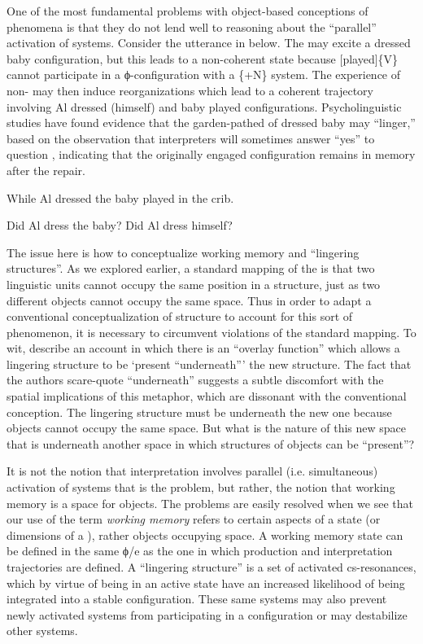 One of the most fundamental problems with object-based conceptions of  phenomena is that they do not lend well to reasoning about the “parallel” activation of systems. Consider the  utterance in  below. The  may excite a {\textbar}dressed baby{\textbar} configuration, but this leads to a non-coherent state because [played]\{V\} cannot participate in a ϕ-configuration with a \{+N\} system. The experience of non- may then induce reorganizations which lead to a coherent trajectory involving {\textbar}Al dressed (himself){\textbar} and {\textbar}baby played{\textbar} configurations. Psycholinguistic studies have found evidence that the garden-pathed  of {\textbar}dressed baby{\textbar} may “linger,” based on the observation that interpreters will sometimes answer “yes” to question  \citep{SlatteryEtAl2013}, indicating that the originally engaged configuration remains in memory after the repair.

\ea\label{ex:6:1ter}
{While Al dressed the baby played in the crib.}
\z

\ea
\ea \label{ex:6:2tera} {Did Al dress the baby?}
\ex \label{ex:6:2terb }{Did Al dress himself?}
\z
\z

The issue here is how to conceptualize working memory and “lingering structures”. As we explored earlier, a standard mapping of the  is that two linguistic units cannot occupy the same position in a structure, just as two different objects cannot occupy the same space. Thus in order to adapt a conventional conceptualization of structure to account for this sort of phenomenon, it is necessary to circumvent violations of the standard mapping. To wit, \citet{SlatteryEtAl2013} describe an account in which there is an “overlay function” which allows a lingering structure to be ‘present “underneath”’ the new structure. The fact that the authors scare-quote “underneath” suggests a subtle discomfort with the spatial implications of this metaphor, which are dissonant with the conventional conception. The lingering structure must be underneath the new one because objects cannot occupy the same space. But what is the nature of this new space that is underneath another space in which structures of objects can be “present”?

It is not the notion that interpretation involves parallel (i.e. simultaneous) activation of systems that is the problem, but rather, the notion that working memory is a space for objects. The problems are easily resolved when we see that our use of the term \textit{working memory} refers to certain aspects of a state (or dimensions of a ), rather objects occupying space. A working memory state can be defined in the same ϕ/e  as the one in which production and interpretation trajectories are defined. A “lingering structure” is a set of activated cs-resonances, which by virtue of being in an active state have an increased likelihood of being integrated into a stable configuration. These same systems may also prevent newly activated systems from participating in a configuration or may destabilize other systems.

